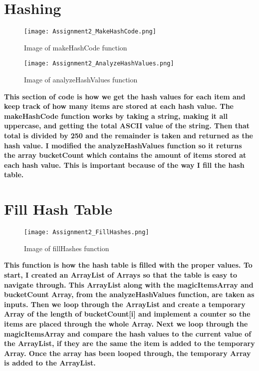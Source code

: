 \documentclass{article}
\begin{document}
\section{Hashing}
\begin{figure}[h]
    \centering
    \texttt{[image: Assignment2\_MakeHashCode.png]}
    \caption{Image of makeHashCode function}
    \label{fig:makeHashCode}
\end{figure}

\begin{figure}[h]
    \centering
    \texttt{[image: Assignment2\_AnalyzeHashValues.png]}
    \caption{Image of analyzeHashValues function}
    \label{fig:analyzeHashValues}
\end{figure}
\textbf{This section of code is how we get the hash values for each item and keep track of how many items are stored at each hash value. The makeHashCode function works by taking a string, making it all uppercase, and getting the total ASCII value of the string. Then that total is divided by 250 and the remainder is taken and returned as the hash value. I modified the analyzeHashValues function so it returns the array bucketCount which contains the amount of items stored at each hash value. This is important because of the way I fill the hash table.}
\newpage

\section{Fill Hash Table}
\begin{figure}[h]
    \centering
    \texttt{[image: Assignment2\_FillHashes.png]}
    \caption{Image of fillHashes function}
    \label{fig:fillHashes}
\end{figure}
\textbf{This function is how the hash table is filled with the proper values. To start, I created an ArrayList of Arrays so that the table is easy to navigate through. This ArrayList along with the magicItemsArray and bucketCount Array, from the analyzeHashValues function, are taken as inputs. Then we loop through the ArrayList and create a temporary Array of the length of bucketCount[i] and implement a counter so the items are placed through the whole Array. Next we loop through the magicItemsArray and compare the hash values to the current value of the ArrayList, if they are the same the item is added to the temporary Array. Once the array has been looped through, the temporary Array is added to the ArrayList.}
\newpage
\end{document}
